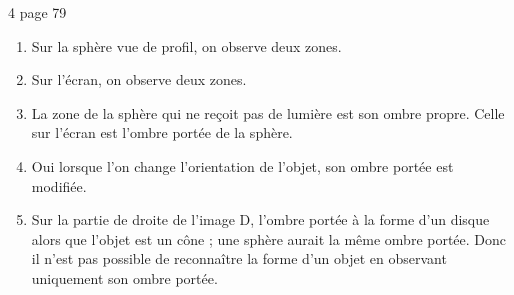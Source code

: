 \begin{myact}{4 page 79}
	\begin{enumerate}
		\item Sur la sphère vue de profil, on observe deux zones.\pause
		\item  Sur l'écran, on observe deux zones.\pause
		\item La zone de la sphère qui ne reçoit pas de lumière est son ombre propre. Celle sur l'écran est l'ombre portée de la sphère.\pause
		\item Oui lorsque l'on change l'orientation de l'objet, son ombre portée est modifiée.\pause
		\item Sur la partie de droite de l'image D, l'ombre portée à la forme d'un disque alors que l'objet est un cône ; une sphère aurait la même ombre portée. Donc il n'est pas possible de reconnaître la forme d'un objet en observant uniquement son ombre portée.
	\end{enumerate}
\end{myact}